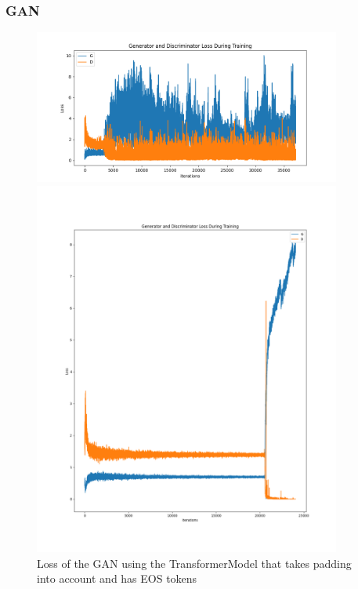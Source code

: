 \documentclass{article}
\begin{document}
\subsubsection{GAN}

\begin{figure}[h]
    \centering
    \begin{minipage}{0.45\textwidth}
        \includegraphics[width=0.9\textwidth]{gan.png}
        \caption{%
            Loss of the GAN using the standard TransformerModel
        }\label{fig:gan}
    \end{minipage}
    \begin{minipage}{0.45\textwidth}
        \includegraphics[width=0.9\textwidth]{GAN-loss-double_batch-Adam-no_random.png}
        \caption{%
            Loss of the GAN using the TransformerModel that takes padding into account and has EOS tokens
        }\label{fig:ganPaddingEOS}
    \end{minipage}
\end{figure}
\end{document}
